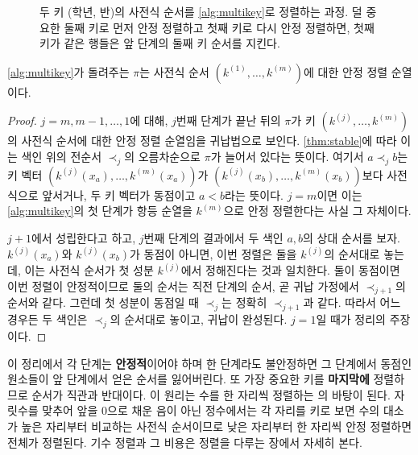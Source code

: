 \begin{figure}[htbp]
\centering
{}
\caption{두 키 (학년, 반)의 사전식 순서를 \cref{alg:multikey}로 정렬하는 과정. 덜 중요한 둘째 키로 먼저 안정 정렬하고 첫째 키로 다시 안정 정렬하면, 첫째 키가 같은 행들은 앞 단계의 둘째 키 순서를 지킨다.}
\label{fig:lsd-steps}
\end{figure}

\begin{theorem}
\label{thm:lsd}
\cref{alg:multikey}가 돌려주는 $\pi$는 사전식 순서 $(k^{(1)},\dots,k^{(m)})$에 대한 안정 정렬 순열이다.
\end{theorem}

\begin{proof}
$j=m,m-1,\dots,1$에 대해, $j$번째 단계가 끝난 뒤의 $\pi$가 키 $(k^{(j)},\dots,k^{(m)})$의 사전식 순서에 대한 안정 정렬 순열임을 귀납법으로 보인다. \cref{thm:stable}에 따라 이는 색인 위의 전순서 $\prec_j$의 오름차순으로 $\pi$가 늘어서 있다는 뜻이다. 여기서 $a\prec_j b$는 키 벡터 $(k^{(j)}(x_a),\dots,k^{(m)}(x_a))$가 $(k^{(j)}(x_b),\dots,k^{(m)}(x_b))$보다 사전식으로 앞서거나, 두 키 벡터가 동점이고 $a<b$라는 뜻이다. $j=m$이면 이는 \cref{alg:multikey}의 첫 단계가 항등 순열을 $k^{(m)}$으로 안정 정렬한다는 사실 그 자체이다.

$j+1$에서 성립한다고 하고, $j$번째 단계의 결과에서 두 색인 $a,b$의 상대 순서를 보자. $k^{(j)}(x_a)$와 $k^{(j)}(x_b)$가 동점이 아니면, 이번 정렬은 둘을 $k^{(j)}$의 순서대로 놓는데, 이는 사전식 순서가 첫 성분 $k^{(j)}$에서 정해진다는 것과 일치한다. 둘이 동점이면 이번 정렬이 안정적이므로 둘의 순서는 직전 단계의 순서, 곧 귀납 가정에서 $\prec_{j+1}$의 순서와 같다. 그런데 첫 성분이 동점일 때 $\prec_j$는 정확히 $\prec_{j+1}$과 같다. 따라서 어느 경우든 두 색인은 $\prec_j$의 순서대로 놓이고, 귀납이 완성된다. $j=1$일 때가 정리의 주장이다.
\end{proof}

이 정리에서 각 단계는 \textbf{안정적}이어야 하며 한 단계라도 불안정하면 그 단계에서 동점인 원소들이 앞 단계에서 얻은 순서를 잃어버린다. 또 가장 중요한 키를 \textbf{마지막에} 정렬하므로 순서가 직관과 반대이다. 이 원리는 수를 한 자리씩 정렬하는 의 바탕이 된다. 자릿수를 맞추어 앞을 $0$으로 채운 음이 아닌 정수에서는 각 자리를 키로 보면 수의 대소가 높은 자리부터 비교하는 사전식 순서이므로 낮은 자리부터 한 자리씩 안정 정렬하면 전체가 정렬된다. 기수 정렬과 그 비용은 정렬을 다루는 장에서 자세히 본다.

